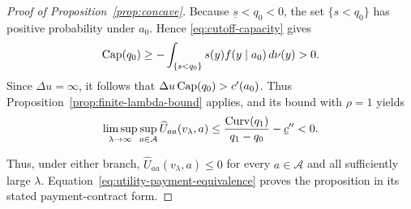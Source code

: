 \begin{proof}[Proof of Proposition~\ref{prop:concave}]
Because $\underline s<q_0<0$, the set $\{s<q_0\}$ has positive probability
under $a_0$.  Hence \eqref{eq:cutoff-capacity} gives
\[
    \mathrm{Cap}(q_0)
    \geq-\int_{\{s<q_0\}}s(y)f(y\mid a_0)\,d\nu(y)>0.
\]
Since $\Delta u=\infty$, it follows that
$\Delta u\,\mathrm{Cap}(q_0)>c'(a_0)$.  Thus Proposition~\ref{prop:finite-lambda-bound} applies, and its bound with $\rho=1$ yields
\[
 \limsup_{\lambda\to\infty}\sup_{a\in\mathcal A}
 \widehat U_{aa}(v_\lambda,a)
 \leq\frac{\mathrm{Curv}(q_1)}{q_1-q_0}-\underline c''<0.
\]

Thus, under either branch, $\widehat U_{aa}(v_\lambda,a)\leq0$ for every
$a\in\mathcal A$ and all sufficiently large $\lambda$.  Equation~\eqref{eq:utility-payment-equivalence} proves the proposition in its stated
payment-contract form.
\end{proof}
